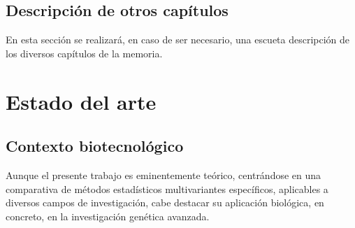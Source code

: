 \documentclass[IB,BIB]{TFUOC}%
\begin{document}
\normalsize


\section{Descripción de otros capítulos}
\label{sec:Descripción de otros capítulos}

En esta sección se realizará, en caso de ser necesario, una escueta descripción de los diversos capítulos de la memoria.







\chapter{Estado del arte}
\label{chap:Introducción}

% 
% 


\section{Contexto biotecnológico}
\label{sec:Contexto biotecnológico}

Aunque el presente trabajo es eminentemente teórico, centrándose en una comparativa de métodos estadísticos multivariantes específicos, aplicables a diversos campos de investigación, cabe destacar su aplicación biológica, en concreto, en la investigación genética avanzada.
\end{document}
